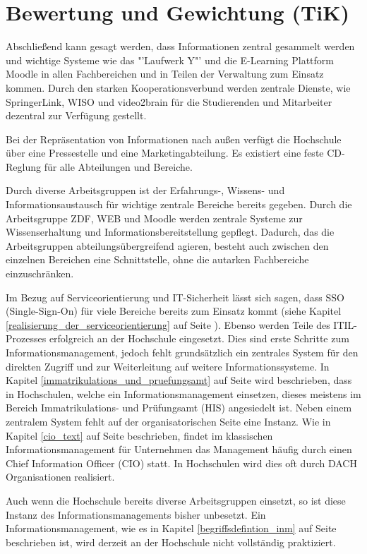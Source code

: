 \section{Bewertung und Gewichtung (TiK)}
Abschließend kann gesagt werden, dass Informationen zentral gesammelt werden und wichtige Systeme wie das "'Laufwerk Y"' und die E-Learning Plattform Moodle in allen Fachbereichen und in Teilen der Verwaltung zum Einsatz kommen. Durch den starken Kooperationsverbund werden zentrale Dienste, wie SpringerLink, WISO und video2brain für die Studierenden und Mitarbeiter dezentral zur Verfügung gestellt. 

Bei der Repräsentation von Informationen nach außen verfügt die Hochschule über eine Pressestelle und eine Marketingabteilung. Es existiert eine feste CD-Reglung für alle Abteilungen und Bereiche. 

Durch diverse Arbeitsgruppen ist der Erfahrungs-, Wissens- und Informationsaustausch für wichtige zentrale Bereiche bereits gegeben. Durch die Arbeitsgruppe ZDF, WEB und Moodle werden zentrale Systeme zur Wissenserhaltung und Informationsbereitstellung gepflegt. Dadurch, das die Arbeitsgruppen abteilungsübergreifend agieren, besteht auch zwischen den einzelnen Bereichen eine Schnittstelle, ohne die autarken Fachbereiche einzuschränken. 

Im Bezug auf Serviceorientierung und IT-Sicherheit lässt sich sagen, dass SSO (Single-Sign-On) für viele Bereiche bereits zum Einsatz kommt (siehe Kapitel \ref{realisierung_der_serviceorientierung} auf Seite \pageref{realisierung_der_serviceorientierung}). Ebenso werden Teile des ITIL-Prozesses erfolgreich an der Hochschule eingesetzt. Dies sind erste Schritte zum Informationsmanagement, jedoch fehlt grundsätzlich ein zentrales System für den direkten Zugriff und zur Weiterleitung auf weitere Informationssysteme. In Kapitel \ref{immatrikulations_und_pruefungsamt} auf Seite \pageref{immatrikulations_und_pruefungsamt} wird beschrieben, dass in Hochschulen, welche ein Informationsmanagement einsetzen, dieses meistens im Bereich Immatrikulations- und Prüfungsamt (HIS) angesiedelt ist. 
Neben einem  zentralem System fehlt auf der organisatorischen Seite eine Instanz. Wie in Kapitel \ref{cio_text} auf Seite \pageref{cio_text} beschrieben, findet im klassischen Informationsmanagement für Unternehmen das Management häufig durch einen Chief Information Officer (CIO) statt. In Hochschulen wird dies oft durch DACH Organisationen realisiert. 

Auch wenn die Hochschule bereits diverse Arbeitsgruppen einsetzt, so ist diese Instanz des Informationsmanagements bisher unbesetzt. Ein Informationsmanagement, wie es in Kapitel \ref{begriffsdefintion_inm} auf Seite \pageref{begriffsdefintion_inm} beschrieben ist, wird derzeit an der Hochschule nicht vollständig praktiziert.
